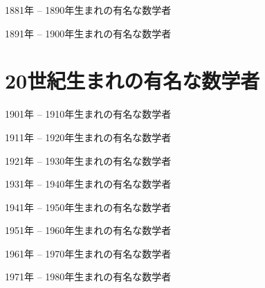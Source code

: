 \documentclass[a4paper,12pt,dvipdfmx]{jsarticle}
\theoremstyle{plain}
\theoremstyle{remark}  %
\theoremstyle{definition}  %
\begin{document}
1881年 -- 1890年生まれの有名な数学者

1891年 -- 1900年生まれの有名な数学者

\section{20世紀生まれの有名な数学者}
1901年 -- 1910年生まれの有名な数学者

1911年 -- 1920年生まれの有名な数学者

1921年 -- 1930年生まれの有名な数学者

1931年 -- 1940年生まれの有名な数学者

1941年 -- 1950年生まれの有名な数学者

1951年 -- 1960年生まれの有名な数学者

1961年 -- 1970年生まれの有名な数学者

1971年 -- 1980年生まれの有名な数学者




\end{document}
